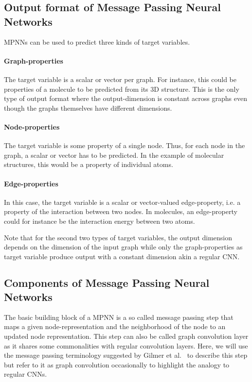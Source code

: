 \subsection{Output format of Message Passing Neural Networks}
\label{sec:graph-output}

MPNNs can be used to predict three kinds of target variables.

\paragraph{Graph-properties}
The target variable is a scalar or vector per graph. For instance, this could be properties of a molecule to be predicted from its 3D structure. This is the only type of output format where the output-dimension is constant across graphs even though the graphs themselves have different dimensions.
\paragraph{Node-properties}
The target variable is some property of a single node. Thus, for each node in the graph, a scalar or vector has to be predicted. In the example of molecular structures, this would be a property of individual atoms.
\paragraph{Edge-properties}
In this case, the target variable is a scalar or vector-valued edge-property, i.e. a property of the interaction between two nodes. In molecules, an edge-property could for instance be the interaction energy between two atoms.

Note that for the second two types of target variables, the output dimension depends on the dimension of the input graph while only the graph-properties as target variable produce output with a constant dimension akin a regular CNN.

\subsection{Components of Message Passing Neural Networks}


The basic building block of a MPNN is a so called message passing step that maps a given node-representation and the neighborhood of the node to an updated node representation. This step can also be called  graph convolution layer as it shares some commonalities with regular convolution layers. Here, we will use the message passing terminology suggested by Gilmer et al.~\cite{Gilmer2017} to describe this step but refer to it as graph convolution occasionally to highlight the analogy to regular CNNs.

